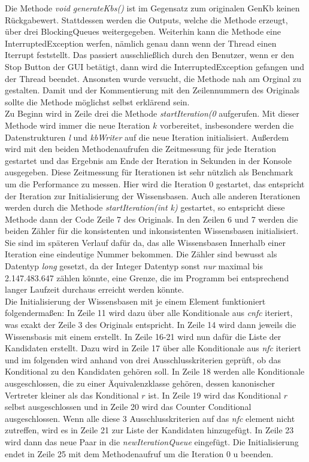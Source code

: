 \documentclass[12pt,a4paper]{article}
\begin{document}
Die Methode \textit{void generateKbs()} ist im Gegensatz zum originalen GenKb keinen Rückgabewert. Stattdessen werden die Outputs, welche die Methode erzeugt, über drei BlockingQueues weitergegeben. Weiterhin kann die Methode eine InterruptedException werfen, nämlich genau dann wenn der Thread einen Iterrupt feststellt. Das passiert ausschließlich durch den Benutzer, wenn er den Stop Button der GUI betätigt, dann wird die InterruptedException gefangen und der Thread beendet.
 Ansonsten wurde versucht, die Methode nah am Orginal zu gestalten. Damit und der Kommentierung mit den Zeilennummern des Originals sollte die Methode möglichst selbst erklärend sein.\\
Zu Beginn wird in Zeile drei die Methode \textit{startIteration(0} aufgerufen. Mit dieser Methode wird immer die neue Iteration $k$ vorbereitet, insbesondere werden die Datenstrukturen \textit{l} und \textit{kbWriter} auf die neue Iteration initialisiert. Außerdem wird mit den beiden Methodenaufrufen die Zeitmessung für jede Iteration gestartet und das Ergebnis am Ende der Iteration in Sekunden in der Konsole ausgegeben. Diese Zeitmessung für Iterationen ist sehr nützlich als Benchmark um die Performance zu messen. Hier wird die Iteration 0 gestartet, das entspricht der Iteration zur Initialisierung der Wissensbasen. Auch alle anderen Iterationen werden durch die Methode \textit{startIteration(int k)} gestartet, so entspricht diese Methode dann der Code Zeile 7 des Originals. In den Zeilen 6 und 7 werden die beiden Zähler für die konsistenten und inkonsistenten Wissensbasen initialisiert. Sie sind im späteren Verlauf dafür da, das alle Wissensbasen Innerhalb einer Iteration eine eindeutige Nummer bekommen. Die Zähler sind bewusst als Datentyp \textit{long} gesetzt, da der Integer Datentyp sonst \textit{nur} maximal bis 2.147.483.647 zählen könnte, eine Grenze, die im Programm bei entsprechend langer Laufzeit durchaus erreicht werden könnte. \\
Die Initialisierung der Wissensbasen mit je einem Element funktioniert folgendermaßen: In Zeile 11 wird dazu über alle Konditionale aus \textit{cnfc} iteriert, was exakt der Zeile 3 des Originals entspricht. In Zeile 14 wird dann jeweils die Wissensbasis mit einem erstellt. In Zeile 16-21 wird nun dafür die Liste der Kandidaten erstellt. Dazu wird in Zeile 17 über alle Konditionale aus \textit{nfc} iteriert und im folgenden wird anhand von drei Ausschlusskriterien geprüft, ob das Konditional zu den Kandidaten gehören soll. In Zeile 18 werden alle Konditionale ausgeschlossen, die zu einer Äquivalenzklasse gehören, dessen kanonischer Vertreter kleiner als das Konditional $r$ ist. In Zeile 19 wird das Konditional $r$ selbst ausgeschlossen und in  Zeile 20 wird das Counter Conditional ausgeschlossen. Wenn alle diese 3 Ausschlusskriterien auf das \textit{nfc} element nicht zutreffen, wird es in Zeile 21 zur Liste der Kandidaten hinzugefügt. In Zeile 23 wird dann das neue Paar in die \textit{newIterationQueue} eingefügt. Die Initialisierung endet in Zeile 25 mit dem Methodenaufruf um die Iteration 0 u beenden. \\
\end{document}
